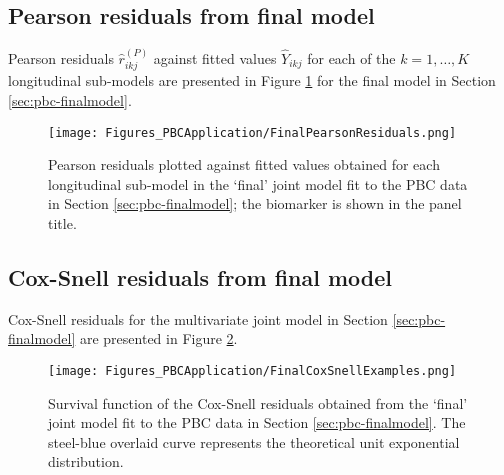 \subsection{Pearson residuals from final model}\label{sec:appendix-suppfigs-finalpearson}
Pearson residuals $\hat{r}_{ikj}^{(P)}$ against fitted values $\hat{Y}_{ikj}$ for each of the $k=1,\dots,K$ longitudinal sub-models are presented in Figure \ref{fig:appendix-suppfigs-finalpearson} for the final model in Section \ref{sec:pbc-finalmodel}.
\begin{figure}[ht]
    \centering
    \texttt{[image: Figures\_PBCApplication/FinalPearsonResiduals.png]}
    \caption{Pearson residuals plotted against fitted values obtained for each longitudinal sub-model in the `final' joint model fit to the PBC data in Section \ref{sec:pbc-finalmodel}; the biomarker is shown in the panel title.}
    \label{fig:appendix-suppfigs-finalpearson}
\end{figure}

\subsection{Cox-Snell residuals from final model}\label{sec:appendix-suppfigs-finalcoxsnell}
Cox-Snell residuals for the multivariate joint model in Section \ref{sec:pbc-finalmodel} are presented in Figure \ref{fig:appendix-suppfigs-finalcoxsnell}. 
\begin{figure}[ht]
    \centering
    \texttt{[image: Figures\_PBCApplication/FinalCoxSnellExamples.png]}
    \caption{Survival function of the Cox-Snell residuals obtained from the `final' joint model fit to the PBC data in Section \ref{sec:pbc-finalmodel}. The steel-blue overlaid curve represents the theoretical unit exponential distribution.}
    \label{fig:appendix-suppfigs-finalcoxsnell}
\end{figure}

\resettocappx